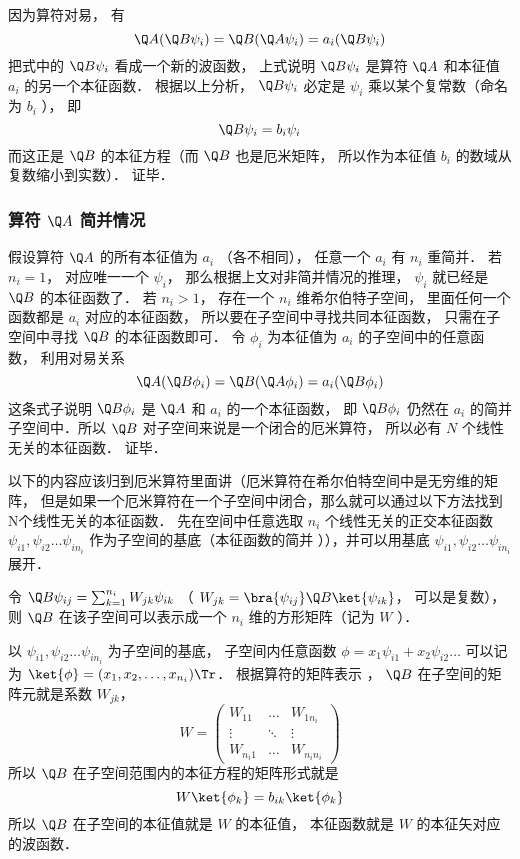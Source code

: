 因为算符对易， 有
\begin{equation}
\Q A (\Q B \psi_i) = \Q B (\Q A \psi_i) = a_i (\Q B \psi_i)
\end{equation}
把式中的 $\Q B \psi_i$ 看成一个新的波函数， 上式说明 $\Q B \psi_i$ 是算符 $\Q A$ 和本征值 $a_i$ 的另一个本征函数． 根据以上分析， $\Q B \psi_i$ 必定是 $\psi_i$ 乘以某个复常数（命名为 $b_i$ ）， 即
\begin{equation}
\Q B \psi_i = b_i \psi_i
\end{equation}
而这正是 $\Q B$ 的本征方程（而 $\Q B$ 也是厄米矩阵， 所以作为本征值 $b_i$ 的数域从复数缩小到实数）． 证毕．

\subsubsection{算符 $\Q A$ 简并情况}
假设算符 $\Q A$ 的所有本征值为 $a_i$ （各不相同）， 任意一个 $a_i$ 有 $n_i$ 重简并． 若 $n_i = 1$，  对应唯一一个 $\psi_i$，  那么根据上文对非简并情况的推理， $\psi_i$ 就已经是 $\Q B$ 的本征函数了． 若 $n_i > 1$，  存在一个 $n_i$ 维希尔伯特子空间， 里面任何一个函数都是 $a_i$ 对应的本征函数， 所以要在子空间中寻找共同本征函数， 只需在子空间中寻找 $\Q B$ 的本征函数即可． 令 $\phi_i$ 为本征值为 $a_i$ 的子空间中的任意函数， 利用对易关系
\begin{equation}
\Q A (\Q B \phi_i) = \Q B (\Q A \phi_i) = a_i (\Q B \phi_i)
\end{equation}
这条式子说明 $\Q B \phi_i$ 是 $\Q A$ 和 $a_i$ 的一个本征函数， 即 $\Q B \phi_i$ 仍然在 $a_i$ 的简并子空间中．所以 $\Q B$ 对子空间来说是一个闭合的厄米算符， 所以必有 $N$ 个线性无关的本征函数． 证毕．%

以下的内容应该归到厄米算符里面讲（厄米算符在希尔伯特空间中是无穷维的矩阵， 但是如果一个厄米算符在一个子空间中闭合，那么就可以通过以下方法找到N个线性无关的本征函数．%
先在空间中任意选取 $n_i$ 个线性无关的正交本征函数 $\psi_{i1}, \psi_{i2}\dots \psi_{i n_i}$ 作为子空间的基底（本征函数的简并%
）），并可以用基底 $\psi_{i1}, \psi_{i2}\dots \psi_{i n_i}$ 展开．

令 $\Q B \psi_{ij} = \sum_{k=1}^{n_i} W_{jk}\psi_{ik}$ （ $W_{jk} = \bra{\psi_{ij}} \Q B \ket{\psi_{ik}}$， 可以是复数）， 则 $\Q B$ 在该子空间可以表示成一个 $n_i$ 维的方形矩阵（记为 $W$ ）．

以 $\psi_{i1}, \psi_{i2} \dots \psi_{i n_i}$ 为子空间的基底， 子空间内任意函数 $\phi  = x_1 \psi_{i1} + x_2 \psi_{i2}\dots$ 可以记为 $\ket{\phi} = (x_1, x_2, \dots, x_{n_i})\Tr$． 根据算符的矩阵表示%
， $\Q B$ 在子空间的矩阵元就是系数 $W_{jk}$， 
\begin{equation}
W = \begin{pmatrix}
W_{11} & \ldots & W_{1 n_i}\\
\vdots & \ddots & \vdots \\
W_{n_i 1} & \ldots & W_{n_i n_i}
\end{pmatrix}
\end{equation}
所以 $\Q B$ 在子空间范围内的本征方程的矩阵形式就是
\begin{equation}
W \ket{\phi_k} = b_{ik} \ket{\phi_k}
\end{equation}
所以 $\Q B$ 在子空间的本征值就是 $W$ 的本征值， 本征函数就是 $W$ 的本征矢对应的波函数．

